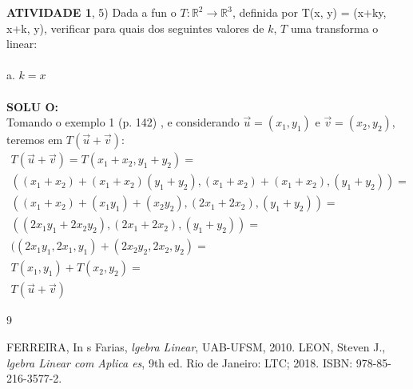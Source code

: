 \documentclass{article}
\begin{document}
\newpage
\onehalfspacing 
\noindent
\textbf{ATIVIDADE 1}, 5) Dada a fun o $T:\mathbb{R}^2 \rightarrow \mathbb{R}^3$, definida por T(x, y) = (x+ky, x+k, y), verificar para quais dos seguintes valores de $k$, $T$   uma transforma o linear: \\
\\
a. $k = x$ \\
\\
{\textbf{SOLU O:}} \\
Tomando o exemplo 1 (p. 142) \cite{ines}, e considerando $\vec{u}=(x_1,y_1)$ e $\vec{v}=(x_2,y_2)$, teremos em $T(\vec{u}+\vec{v})$:\\
\begin{equation}
    \begin{split}
        T(\vec{u}+\vec{v})=T(x_1+x_2, y_1+y_2)=\\
        ((x_1+x_2)+(x_1+x_2)(y_1+y_2),(x_1+x_2)+(x_1+x_2), (y_1+y_2))=\\
        ((x_1+x_2)+(x_1 y_1)+(x_2 y_2),(2x_1+2x_2),(y_1+y_2))=\\
        ((2x_1 y_1+2x_2 y_2), (2x_1 +2x_2), (y_1+y_2))=\\
        ((2x_1 y_1, 2x_1, y_1) + (2x_2 y_2, 2x_2, y_2)=\\
        T(x_1,y_1)+T(x_2,y_2)=\\
        T(\vec{u}+\vec{v})
    \end{split}
\end{equation}



\newpage
\noindent 

\begin{thebibliography}{9}

 FERREIRA, In s Farias,
	\emph{ lgebra Linear}, UAB-UFSM, 2010.
 LEON, Steven J.,
	\emph{ lgebra Linear com Aplica es}, 9th ed. Rio de Janeiro: LTC; 2018. ISBN: 978-85-216-3577-2.

\end{thebibliography}
\end{document}

